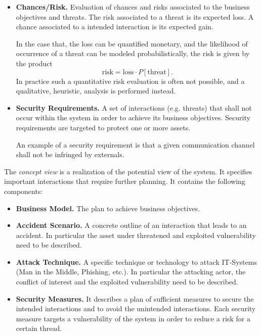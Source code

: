 \documentclass[runningheads,a4paper]{llncs}
\newenvironment{LGContent}
{ \par\color{blue} \it \small }
{ \par }
\begin{document}
\begin{LGContent}
\begin{itemize}
\item \textbf{Chances/Risk.}
Evaluation of chances and risks associated to the business objectives and threats.
The risk associated to a threat is its expected loss.
A chance associated to a intended interaction is its expected gain.

In the case that, the loss can be quantified monetary, and the likelihood of occurrence of a threat can
be modeled probabilistically, the risk is given by the product
\[ \text{risk} = \text{loss} \cdot P[\text{threat}]. \]
In practice such a quantitative risk evaluation is often not possible, and a qualitative, heuristic, analysis is performed instead.

\item \textbf{Security Requirements.}
A set of interactions (e.g. threats) that shall not occur within the system in order to achieve its business objectives.
Security requirements are targeted to protect one or more assets.

An example of a security requirement is that a given communication channel shall not be infringed by externals.
\end{itemize}




The \emph{concept view} is a realization of the potential view of the system.
It specifies important interactions that require further planning.
It contains the following components:
\begin{itemize}
\item \textbf{Business Model.}
The plan to achieve business objectives.

\item \textbf{Accident Scenario.}
A concrete outline of an interaction that leads to an accident.
In particular the asset under threatened and exploited vulnerability need to be described.

\item \textbf{Attack Technique.}
A specific technique or technology to attack IT-Systems (Man in the Middle, Phishing, etc.).
In particular the attacking actor, the conflict of interest and the exploited vulnerability need to be described.

\item \textbf{Security Measures.}
It describes a plan of sufficient measures to secure the intended interactions and to avoid the unintended interactions.
Each security measure targets a vulnerability of the system in order to reduce a risk for a certain thread.
\end{itemize}



\end{LGContent}
\end{document}
